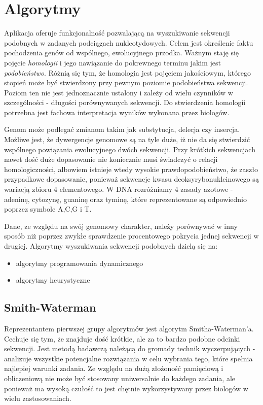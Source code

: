\section{Algorytmy}
Aplikacja oferuje funkcjonalność pozwalającą na wyszukiwanie sekwencji podobnych w zadanych podciągach nukleotydowych.
Celem jest określenie faktu pochodzenia genów od wspólnego, ewolucyjnego przodka.
Ważnym staję się pojęcie \textit{homologii} i jego nawiązanie do pokrewnego terminu jakim jest \textit{podobieństwo}.
Różnią się tym, że homologia jest pojęciem jakościowym, którego stopień może być stwierdzony przy pewnym poziomie podobieństwa sekwencji.
Poziom ten nie jest jednoznacznie ustalony i zależy od wielu czynników w szczególności - długości porównywanych sekwencji.
Do stwierdzenia homologii potrzebna jest fachowa interpretacja wyników wykonana przez biologów.

Genom może podlegać zmianom takim jak substytucja, delecja czy insercja.
Możliwe jest, że dywergencje genomowe są na tyle duże, iż nie da się stwierdzić wspólnego powiązania ewolucyjnego dwóch sekwencji.
Przy krótkich sekwencjach nawet dość duże dopasowanie nie koniecznie musi świadczyć o relacji homologiczności, albowiem istnieje wtedy wysokie prawdopodobieństwo, że zaszło przypadkowe dopasowanie, ponieważ sekwencje kwasu deoksyrybonukleinowego są wariacją zbioru 4 elementowego. W DNA rozróżniamy 4 zasady azotowe - adeninę, cytozynę, guaninę oraz tyminę, które reprezentowane są odpowiednio poprzez symbole A,C,G i T.

Dane, ze względu na swój genomowy charakter, należy porównywać w inny sposób niż poprzez zwykłe sprawdzenie procentowego pokrycia jednej sekwencji w drugiej.
Algorytmy wyszukiwania sekwencji podobnych dzielą się na:
\begin{itemize}
	\item algorytmy programowania dynamicznego
	\item algorytmy heurystyczne
\end{itemize}


\subsection*{Smith-Waterman}
Reprezentantem pierwszej grupy algorytmów jest algorytm Smitha-Waterman'a.
Cechuje się tym, że znajduje dość krótkie, ale za to bardzo podobne odcinki sekwencji.
Jest metodą badawczą należącą do gromady technik wyczerpujących - analizuje wszystkie potencjalne rozwiązania w celu wybrania tego, które spełnia najlepiej warunki zadania.
Ze względu na dużą złożoność pamięciową i obliczeniową nie może być stosowany uniwersalnie do każdego zadania, ale ponieważ ma wysoką czułość to jest chętnie wykorzystywany przez biologów w wielu zastosowaniach.

